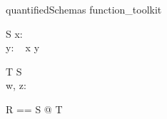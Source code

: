 \begin{zsection}
\SECTION quantifiedSchemas \parents function\_toolkit
\end{zsection}

\begin{schema}{S}
   x: \nat \\
   y: \power~\nat
\where
   x \in y
\end{schema}

\begin{schema}{T}
   S \\
   w, z: \nat
\end{schema}

\begin{zed}
   R == \exists S @ T
\end{zed}